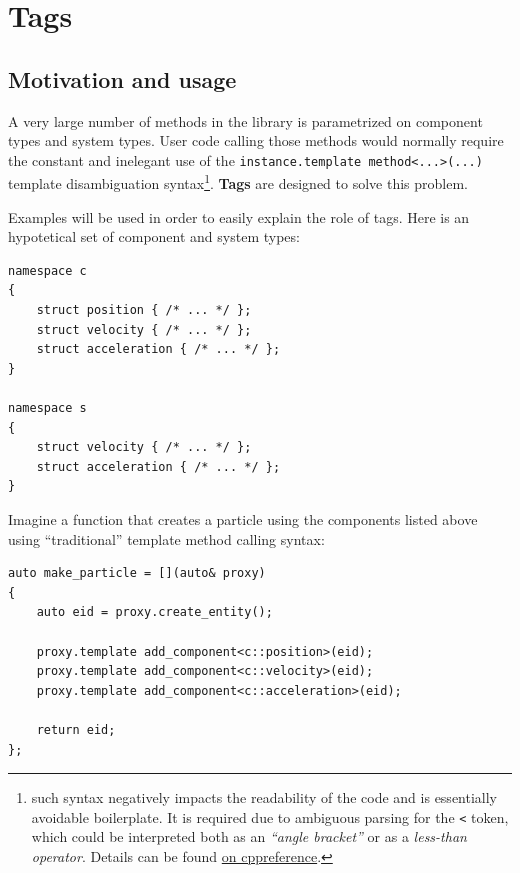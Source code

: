 \documentclass[oneside, 12pt, a4paper, openany]{book}
\begin{document}
\hypertarget{metaprogramming_tags}{\section{Tags}\label{metaprogramming_tags}}

\subsection{Motivation and usage}\label{motivation-and-usage}

A very large number of methods in the library is parametrized on
component types and system types. User code calling those methods would
normally require the constant and inelegant use of the
\texttt{instance.template method<...>(...)}
template disambiguation syntax\footnote{such syntax negatively impacts
  the readability of the code and is essentially avoidable boilerplate.
  It is required due to ambiguous parsing for the
  \texttt{<}
  token, which could be interpreted both as an \emph{``angle bracket''}
  or as a \emph{less-than operator}. Details can be found
  \href{http://en.cppreference.com/w/cpp/language/dependent_name\#The_template_disambiguator_for_dependent_names}{on
  cppreference}.}. \textbf{Tags} are designed to solve this problem.

Examples will be used in order to easily explain the role of tags. Here
is an hypotetical set of component and system types:

\begin{verbatim}
namespace c
{
    struct position { /* ... */ };
    struct velocity { /* ... */ };
    struct acceleration { /* ... */ };
}

namespace s
{
    struct velocity { /* ... */ };
    struct acceleration { /* ... */ };
}
\end{verbatim}

Imagine a function that creates a particle using the components listed
above using ``traditional'' template method calling syntax:

\begin{verbatim}
auto make_particle = [](auto& proxy)
{
    auto eid = proxy.create_entity();

    proxy.template add_component<c::position>(eid);
    proxy.template add_component<c::velocity>(eid);
    proxy.template add_component<c::acceleration>(eid);

    return eid;
};
\end{verbatim}
\end{document}
